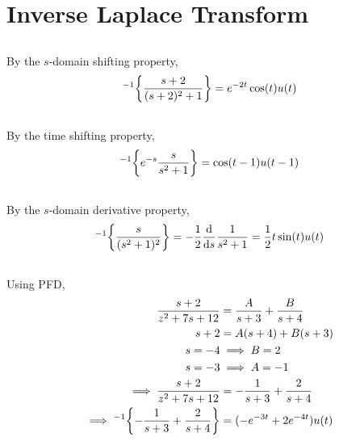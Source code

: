 \documentclass{article}
\let\L\relax
\DeclareMathOperator{\L}{\mathcal{L}}
\begin{document}
\section{Inverse Laplace Transform}

\subsection{}

By the \(s\)-domain shifting property,
\begin{equation}
    \L^{-1}\qty{\frac{s + 2}{(s + 2)^2 + 1}} = e^{-2t} \cos(t) u(t)
\end{equation}

\subsection{}

By the time shifting property,
\begin{equation}
    \L^{-1}\qty{e^{-s} \frac{s}{s^2 + 1}} = \cos(t - 1) u(t - 1)
\end{equation}

\subsection{}

By the \(s\)-domain derivative property,
\begin{equation}
    \L^{-1}\qty{\frac{s}{(s^2 + 1)^2}} = -\frac{1}{2} \dv{s} \frac{1}{s^2 + 1} = \frac{1}{2} t \sin(t) u(t)
\end{equation}

\subsection{}

Using PFD,
\begin{align}
    \frac{s + 2}{z^2 + 7s + 12} &= \frac{A}{s + 3} + \frac{B}{s + 4} \\
    s + 2 &= A (s + 4) + B (s + 3) \\
    s = -4 &\implies B = 2 \\
    s = -3 &\implies A = -1 \\
    \implies \frac{s + 2}{z^2 + 7s + 12} &= -\frac{1}{s + 3} + \frac{2}{s + 4} \\
    \implies \L^{-1}\qty{-\frac{1}{s + 3} + \frac{2}{s + 4}} &= (-e^{-3t} + 2e^{-4t}) u(t)
\end{align}
\end{document}
